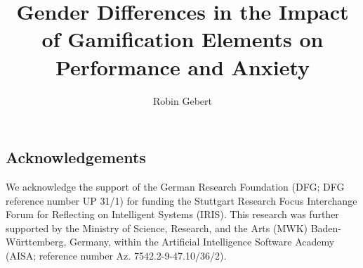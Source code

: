 \documentclass[stu, floatsintext, helv]{apa7}
\title{Gender Differences in the Impact of Gamification Elements on Performance and Anxiety}
\author{Robin Gebert}
\begin{document}
\maketitle


%






\subsection*{Acknowledgements}
We acknowledge the support of the German Research Foundation (DFG; DFG reference number UP 31/1) for funding the Stuttgart Research Focus Interchange Forum for Reflecting on Intelligent Systems (IRIS).
This research was further supported by the Ministry of Science, Research, and the Arts (MWK) Baden-Württemberg, Germany, within the Artificial Intelligence Software Academy (AISA; reference number Az. 7542.2-9-47.10/36/2).

\printbibliography
\end{document}

